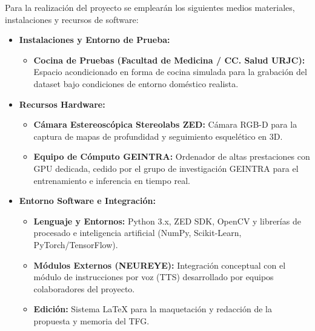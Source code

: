 \documentclass[11pt,a4paper,oneside]{article}
\begin{document}
		Para la realización del proyecto se emplearán los siguientes medios materiales, instalaciones y recursos de software:
		
		\begin{itemize}
			\item \textbf{Instalaciones y Entorno de Prueba:}
			\begin{itemize}
				\item \textbf{Cocina de Pruebas (Facultad de Medicina / CC. Salud URJC):} Espacio acondicionado en forma de cocina simulada para la grabación del dataset bajo condiciones de entorno doméstico realista.
			\end{itemize}
			\item \textbf{Recursos Hardware:}
			\begin{itemize}
				\item \textbf{Cámara Estereoscópica Stereolabs ZED:} Cámara RGB-D para la captura de mapas de profundidad y seguimiento esquelético en 3D.
				\item \textbf{Equipo de Cómputo GEINTRA:} Ordenador de altas prestaciones con GPU dedicada, cedido por el grupo de investigación GEINTRA para el entrenamiento e inferencia en tiempo real.
			\end{itemize}
			\item \textbf{Entorno Software e Integración:}
			\begin{itemize}
				\item \textbf{Lenguaje y Entornos:} Python 3.x, ZED SDK, OpenCV y librerías de procesado e inteligencia artificial (NumPy, Scikit-Learn, PyTorch/TensorFlow).
				\item \textbf{Módulos Externos (NEUREYE):} Integración conceptual con el módulo de instrucciones por voz (TTS) desarrollado por equipos colaboradores del proyecto.
				\item \textbf{Edición:} Sistema \LaTeX{} para la maquetación y redacción de la propuesta y memoria del TFG.
			\end{itemize}
		\end{itemize}
		
		
		
\end{document}
